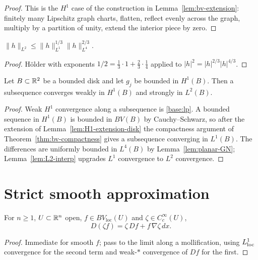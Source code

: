\begin{proof}
This is the $H^1$ case of the construction in Lemma~\ref{lem:bv-extension}:
finitely many Lipschitz graph charts, flatten, reflect evenly across the
graph, multiply by a partition of unity, extend the interior piece by zero.
\end{proof}

\begin{lemma}[$L^2$ interpolation]\label{lem:L2-interp}
$\|h\|_{L^2}\le\|h\|_{L^1}^{1/3}\|h\|_{L^4}^{2/3}$.
\end{lemma}

\begin{proof}
H\"older with exponents $1/2=\tfrac13\cdot1+\tfrac23\cdot\tfrac14$ applied to
$|h|^2=|h|^{2/3}|h|^{4/3}$.
\end{proof}

\begin{theorem}\label{thm:rellich}
Let $B\subset\mathbb R^2$ be a bounded disk and let $g_j$ be bounded in $H^1(B)$.
Then a subsequence converges weakly in $H^1(B)$ and strongly in $L^2(B)$.
\end{theorem}

\begin{proof}
Weak $H^1$ convergence along a subsequence is \ref{base:lp}.  A bounded
sequence in $H^1(B)$ is bounded in $BV(B)$ by Cauchy--Schwarz, so after the
extension of Lemma~\ref{lem:H1-extension-disk} the compactness argument of
Theorem~\ref{thm:bv-compactness} gives a subsequence converging in $L^1(B)$.
The differences are uniformly bounded in $L^4(B)$ by
Lemma~\ref{lem:planar-GN}; Lemma~\ref{lem:L2-interp} upgrades $L^1$
convergence to $L^2$ convergence.
\end{proof}

\section{Strict smooth approximation}\label{sec:strict-approx}

\begin{lemma}\label{lem:bv-product-smooth}
For $n\ge1$, $U\subset\mathbb R^n$ open, $f\in BV_{\mathrm{loc}}(U)$ and
$\zeta\in C^\infty_c(U)$,
\[
  D(\zeta f)=\zeta\,Df+f\,\nabla\zeta\,dx .
\]
\end{lemma}

\begin{proof}
Immediate for smooth $f$; pass to the limit along a mollification, using
$L^1_{\mathrm{loc}}$ convergence for the second term and weak-$*$ convergence of $Df$ for
the first.
\end{proof}

